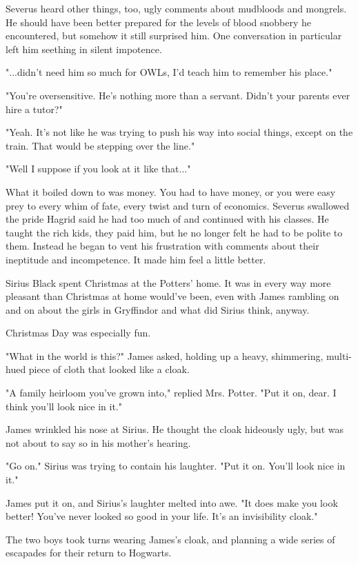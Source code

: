 Severus heard other things, too, ugly comments about mudbloods and mongrels. He should have been better prepared for the levels of blood snobbery he encountered, but somehow it still surprised him. One conversation in particular left him seething in silent impotence.

"...didn't need him so much for OWLs, I'd teach him to remember his place."

"You're oversensitive. He's nothing more than a servant. Didn't your parents ever hire a tutor?"

"Yeah. It's not like he was trying to push his way into social things, except on the train. That would be stepping over the line."

"Well I suppose if you look at it like that..."

What it boiled down to was money. You had to have money, or you were easy prey to every whim of fate, every twist and turn of economics. Severus swallowed the pride Hagrid said he had too much of and continued with his classes. He taught the rich kids, they paid him, but he no longer felt he had to be polite to them. Instead he began to vent his frustration with comments about their ineptitude and incompetence. It made him feel a little better.

Sirius Black spent Christmas at the Potters' home. It was in every way more pleasant than Christmas at home would've been, even with James rambling on and on about the girls in Gryffindor and what did Sirius think, anyway.

Christmas Day was especially fun.

"What in the world is this?" James asked, holding up a heavy, shimmering, multi-hued piece of cloth that looked like a cloak.

"A family heirloom you've grown into," replied Mrs. Potter. "Put it on, dear. I think you'll look nice in it."

James wrinkled his nose at Sirius. He thought the cloak hideously ugly, but was not about to say so in his mother's hearing.

"Go on." Sirius was trying to contain his laughter. "Put it on. You'll look nice in it."

James put it on, and Sirius's laughter melted into awe. "It does make you look better! You've never looked so good in your life. It's an invisibility cloak."

The two boys took turns wearing James's cloak, and planning a wide series of escapades for their return to Hogwarts.

